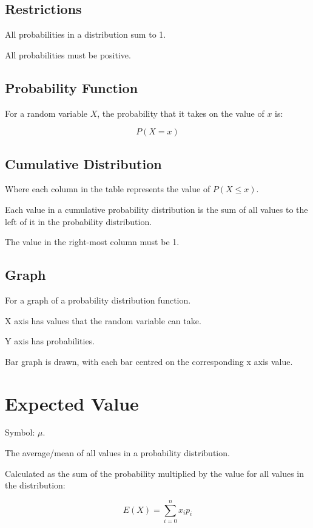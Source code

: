 \documentclass[a4paper,11pt]{article}
\begin{document}
\subsection{Restrictions}

All probabilities in a distribution sum to 1.

All probabilities must be positive.


\subsection{Probability Function}

For a random variable $X$, the probability that it takes on the value of $x$ is:

$$
P(X = x)
$$


\subsection{Cumulative Distribution}

Where each column in the table represents the value of $P(X \leq x)$.

Each value in a cumulative probability distribution is the sum of all values to
the left of it in the probability distribution.

The value in the right-most column must be 1.


\subsection{Graph}

For a graph of a probability distribution function.

X axis has values that the random variable can take.

Y axis has probabilities.

Bar graph is drawn, with each bar centred on the corresponding x axis value.



\section{Expected Value}

Symbol: $\mu$.

The average/mean of all values in a probability distribution.

Calculated as the sum of the probability multiplied by the value for all
values in the distribution:

$$
E(X) = \sum^{n}_{i = 0} x_i p_i
$$
\end{document}
